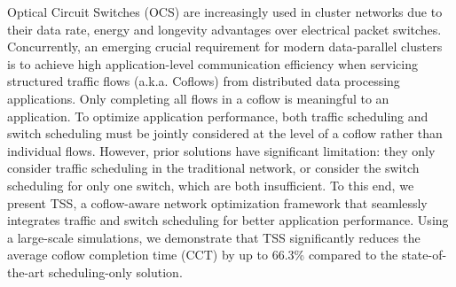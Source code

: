 Optical Circuit Switches (OCS) are increasingly used in cluster networks due to their data rate, energy and longevity advantages over electrical packet switches. Concurrently, an emerging crucial requirement for modern data-parallel clusters is to achieve high application-level communication efficiency when servicing structured traffic flows (a.k.a. Coflows) from distributed data processing applications. Only completing all flows in a coflow is meaningful to an application. To optimize application performance, both traffic scheduling and switch scheduling must be jointly considered at the level of a coflow rather than individual flows. However, prior solutions have significant limitation: they only consider traffic scheduling in the traditional network, or consider the switch scheduling for only one switch, which are both insufficient. To this end, we present TSS, a coflow-aware network optimization framework that seamlessly integrates traffic and switch scheduling for better application performance. Using a large-scale simulations, we demonstrate that TSS significantly reduces the average coflow completion time (CCT) by up to 66.3\% compared to the state-of-the-art scheduling-only solution.
